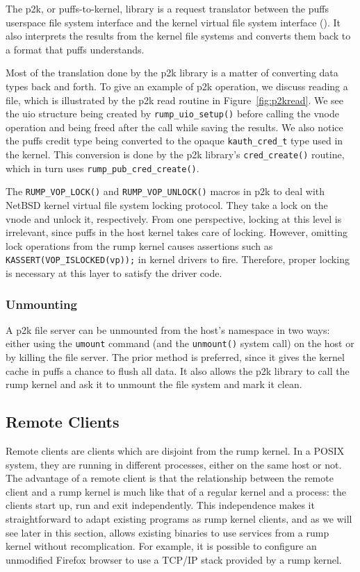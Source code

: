The p2k, or puffs-to-kernel, library is a request translator between
the puffs userspace file system interface and the kernel virtual
file system interface ().  It also interprets
the results from the kernel file systems and converts them back to
a format that puffs understands.

Most of the translation done by the p2k library is a matter of
converting data types back and forth.  To give an example of p2k
operation, we discuss reading a file, which is illustrated by the
p2k read routine in Figure~\ref{fig:p2kread}.  We see the uio
structure being created by \verb+rump_uio_setup()+ before calling
the vnode operation and being freed after the call while saving the
results.  We also notice the puffs credit type being converted to
the opaque \verb+kauth_cred_t+ type used in the kernel.  This conversion
is done by the p2k library's \verb+cred_create()+ routine, which
in turn uses \verb+rump_pub_cred_create()+.

The \verb+RUMP_VOP_LOCK()+ and \verb+RUMP_VOP_UNLOCK()+ macros in
p2k to deal with NetBSD kernel virtual file system locking protocol.
They take a lock on the vnode and unlock it,
respectively.  From one perspective, locking at this level is
irrelevant, since puffs in the host kernel takes care of locking.
However, omitting lock operations from the rump kernel causes assertions
such as \verb+KASSERT(VOP_ISLOCKED(vp));+ in kernel drivers to fire.
Therefore, proper locking is necessary at this layer to satisfy the
driver code.

\subsubsection{Unmounting}

A p2k file server can be unmounted from the host's namespace in
two ways: either using the \texttt{umount} command (and the
\texttt{unmount()} system call) on the host or by killing the file
server.  The prior method is preferred, since it gives the kernel
cache in puffs a chance to flush all data.  It also allows the p2k
library to call the rump kernel and ask it to unmount the file
system and mark it clean.

\subsection{Remote Clients}
\label{sect:sysproxyimpl}

Remote clients are clients which are disjoint from the rump kernel.
In a POSIX system, they are running in different
processes, either on the same host or not.  The advantage of a
remote client is that the relationship between the remote client
and a rump kernel is much like that of a regular kernel and a
process: the clients start up, run and exit independently.
This independence makes it straightforward to adapt existing
programs as rump kernel clients, and as we will see later in this section,
allows existing binaries to use services from a rump kernel without
recomplication.  For example, it is possible to configure an unmodified
Firefox browser to use a TCP/IP stack provided by a rump kernel.

